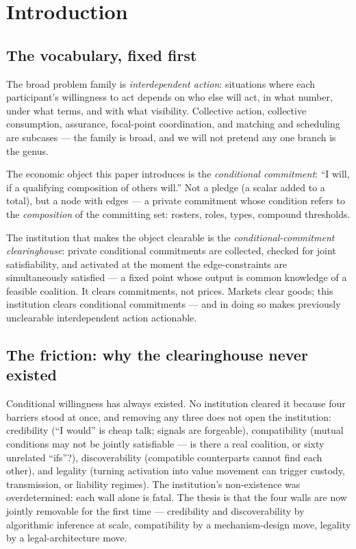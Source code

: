 \documentclass[11pt]{article}
\theoremstyle{definition}
\theoremstyle{remark}
\begin{document}
\section{Introduction}\label{sec:intro}

\subsection{The vocabulary, fixed first}

The broad problem family is \emph{interdependent action}: situations where each
participant's willingness to act depends on who else will act, in what number, under what
terms, and with what visibility. Collective action, collective consumption, assurance,
focal-point coordination, and matching and scheduling are subcases --- the family is broad,
and we will not pretend any one branch is the genus.

The economic object this paper introduces is the \emph{conditional commitment}: ``I will,
if a qualifying composition of others will.'' Not a pledge (a scalar added to a total), but
a node with edges --- a private commitment whose condition refers to the \emph{composition}
of the committing set: rosters, roles, types, compound thresholds.

The institution that makes the object clearable is the \emph{conditional-commitment
clearinghouse}: private conditional commitments are collected, checked for joint
satisfiability, and activated at the moment the edge-constraints are simultaneously
satisfied --- a fixed point whose output is common knowledge of a feasible coalition. It
clears commitments, not prices. Markets clear goods; this institution clears conditional
commitments --- and in doing so makes previously unclearable interdependent action
actionable.

\subsection{The friction: why the clearinghouse never existed}

Conditional willingness has always existed. No institution cleared it because four barriers
stood at once, and removing any three does not open the institution:
credibility (``I would'' is cheap talk; signals are forgeable), compatibility (mutual
conditions may not be jointly satisfiable --- is there a real coalition, or sixty unrelated
``ifs''?), discoverability (compatible counterparts cannot find each other), and legality
(turning activation into value movement can trigger custody, transmission, or liability
regimes). The institution's non-existence was overdetermined: each wall alone is fatal. The
thesis is that the four walls are now jointly removable for the first time --- credibility
and discoverability by algorithmic inference at scale, compatibility by a mechanism-design
move, legality by a legal-architecture move.
\end{document}
